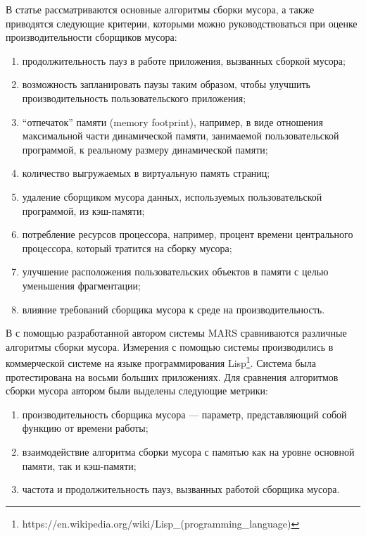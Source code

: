 В статье \cite{book:goetz} рассматриваются основные алгоритмы сборки мусора, а также 
приводятся следующие критерии, которыми можно руководствоваться при оценке производительности
сборщиков мусора:
\begin{enumerate}
\item продолжительность пауз в работе приложения, вызванных сборкой мусора;
\item возможность запланировать паузы таким образом,
чтобы улучшить производительность пользовательского приложения;
\item ``отпечаток'' памяти (memory footprint), например, в виде отношения максимальной части динамической 
памяти, занимаемой пользовательской программой, к реальному размеру динамической памяти;
\item количество выгружаемых в виртуальную память страниц;
\item удаление сборщиком мусора данных, используемых пользовательской
программой, из кэш-памяти;
\item потребление ресурсов процессора, например, процент времени центрального процессора,
который тратится на сборку мусора;
\item улучшение расположения пользовательских объектов в памяти с целью уменьшения 
фрагментации;
\item влияние требований сборщика мусора к среде на производительность. 
\end{enumerate}

В \cite{book:Zorn} с помощью разработанной автором системы MARS сравниваются различные 
алгоритмы сборки мусора. Измерения с помощью системы производились в коммерческой системе на языке
программирования Lisp\footnote{https://en.wikipedia.org/wiki/Lisp\_(programming\_language)}.
Система была протестирована на восьми больших приложениях. Для сравнения алгоритмов сборки мусора 
автором были выделены следующие метрики:
\begin{enumerate}
\item производительность сборщика мусора --- параметр, представляющий собой функцию от
времени работы;
\item взаимодействие алгоритма сборки мусора с памятью как на уровне основной памяти, так и кэш-памяти;
\item частота и продолжительность пауз, вызванных работой сборщика мусора.
\end{enumerate}

